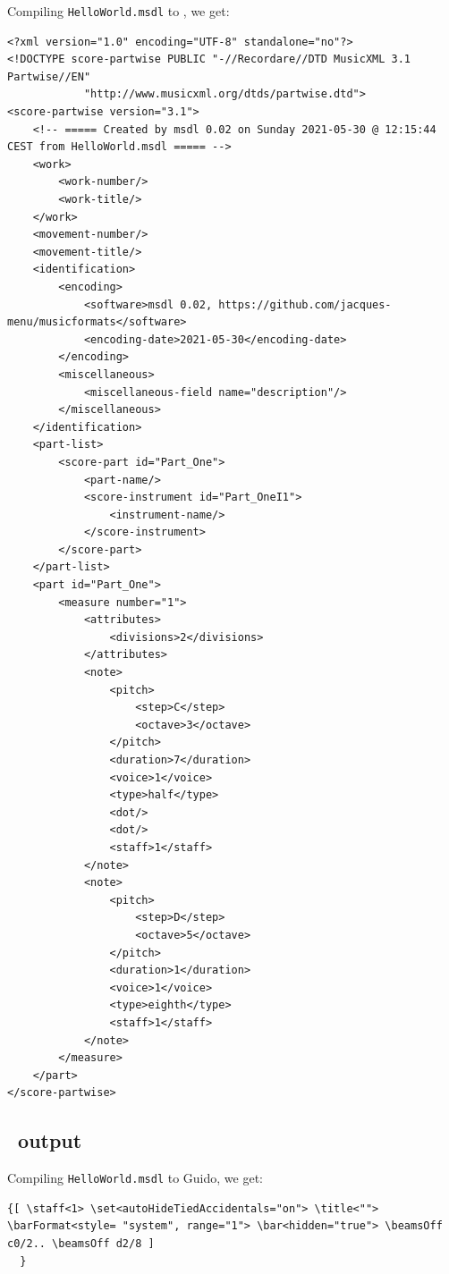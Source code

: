 Compiling {\tt HelloWorld.msdl} to \mxml, we get:
\begin{lstlisting}[language=MusicXML]
<?xml version="1.0" encoding="UTF-8" standalone="no"?>
<!DOCTYPE score-partwise PUBLIC "-//Recordare//DTD MusicXML 3.1 Partwise//EN"
			"http://www.musicxml.org/dtds/partwise.dtd">
<score-partwise version="3.1">
    <!-- ===== Created by msdl 0.02 on Sunday 2021-05-30 @ 12:15:44 CEST from HelloWorld.msdl ===== -->
    <work>
        <work-number/>
        <work-title/>
    </work>
    <movement-number/>
    <movement-title/>
    <identification>
        <encoding>
            <software>msdl 0.02, https://github.com/jacques-menu/musicformats</software>
            <encoding-date>2021-05-30</encoding-date>
        </encoding>
        <miscellaneous>
            <miscellaneous-field name="description"/>
        </miscellaneous>
    </identification>
    <part-list>
        <score-part id="Part_One">
            <part-name/>
            <score-instrument id="Part_OneI1">
                <instrument-name/>
            </score-instrument>
        </score-part>
    </part-list>
    <part id="Part_One">
        <measure number="1">
            <attributes>
                <divisions>2</divisions>
            </attributes>
            <note>
                <pitch>
                    <step>C</step>
                    <octave>3</octave>
                </pitch>
                <duration>7</duration>
                <voice>1</voice>
                <type>half</type>
                <dot/>
                <dot/>
                <staff>1</staff>
            </note>
            <note>
                <pitch>
                    <step>D</step>
                    <octave>5</octave>
                </pitch>
                <duration>1</duration>
                <voice>1</voice>
                <type>eighth</type>
                <staff>1</staff>
            </note>
        </measure>
    </part>
</score-partwise>
\end{lstlisting}

  \subsection{\guido\ output}

Compiling {\tt HelloWorld.msdl} to Guido, we get:
\begin{lstlisting}[language=Guido]
{[ \staff<1> \set<autoHideTiedAccidentals="on"> \title<""> \barFormat<style= "system", range="1"> \bar<hidden="true"> \beamsOff c0/2.. \beamsOff d2/8 ]
  }
\end{lstlisting}


